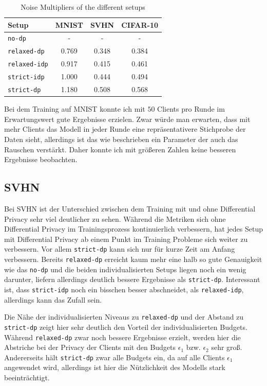 \begin{table}
	\centering
	\begin{tabular}{lccc}
		\toprule
		Setup & MNIST & SVHN & CIFAR-10 \\
		\midrule
		\texttt{no-dp} & - & - & - \\
		\texttt{relaxed-dp} & 0.769 & 0.348 & 0.384 \\
		\texttt{relaxed-idp} & 0.917 & 0.415 & 0.461 \\
		\texttt{strict-idp} & 1.000 & 0.444 & 0.494 \\
		\texttt{strict-dp} & 1.180 & 0.508 & 0.568 \\
		\bottomrule
	\end{tabular}
	\caption{Noise Multipliers of the different setups}
	\label{tab:noise-multipliers}
\end{table}

Bei dem Training auf MNIST konnte ich mit $50$ Clients pro Runde im Erwartungswert gute Ergebnisse erzielen. Zwar würde man erwarten, dass mit mehr Clients das Modell in jeder Runde eine repräsentativere Stichprobe der Daten sieht, allerdings ist das wie beschrieben ein Parameter der auch das Rauschen verstärkt. Daher konnte ich mit größeren Zahlen keine besseren Ergebnisse beobachten.

\subsection{SVHN}

Bei SVHN ist der Unterschied zwischen dem Training mit und ohne Differential Privacy sehr viel deutlicher zu sehen. Während die Metriken sich ohne Differential Privacy im Trainingsprozess kontinuierlich verbessern, hat jedes Setup mit Differential Privacy ab einem Punkt im Training Probleme sich weiter zu verbessern. Vor allem \texttt{strict-dp} kann sich nur für kurze Zeit am Anfang verbessern. Bereits \texttt{relaxed-dp} erreicht kaum mehr eine halb so gute Genauigkeit wie das \texttt{no-dp} und die beiden individualisierten Setups liegen noch ein wenig darunter, liefern allerdings deutlich bessere Ergebnisse als \texttt{strict-dp}. Interessant ist, dass \texttt{strict-idp} noch ein bisschen besser abschneidet, als \texttt{relaxed-idp}, allerdings kann das Zufall sein.

Die Nähe der individualisierten Niveaus zu \texttt{relaxed-dp} und der Abstand zu \texttt{strict-dp} zeigt hier sehr deutlich den Vorteil der individualisierten Budgets. Während \texttt{relaxed-dp} zwar noch bessere Ergebnisse erzielt, werden hier die Abstriche bei der Privacy der Clients mit den Budgets $\epsilon_1$ bzw. $\epsilon_2$ sehr groß. Andererseits hält \texttt{strict-dp} zwar alle Budgets ein, da auf alle Clients $\epsilon_1$ angewendet wird, allerdings ist hier die Nützlichkeit des Modells stark beeinträchtigt.

